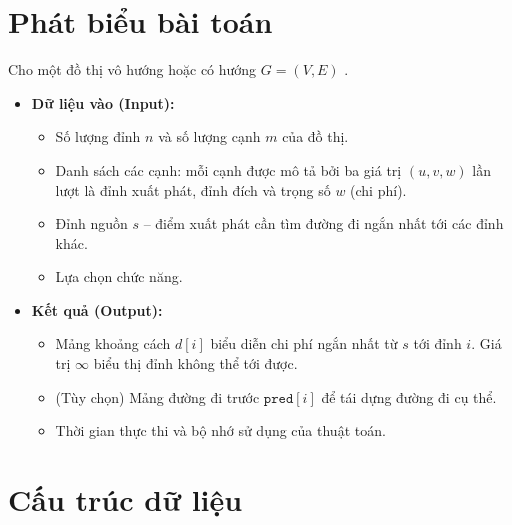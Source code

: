 \documentclass[14pt,a4paper]{report}
\begin{document}
\section{Phát biểu bài toán}
\justifying\fontsize{12pt}{13pt}\selectfont
Cho một đồ thị vô hướng hoặc có hướng $ G = (V, E) $ . 

\begin{itemize}
  \item \textbf{Dữ liệu vào (Input):}
  \begin{itemize}
    \item Số lượng đỉnh $n$ và số lượng cạnh $m$ của đồ thị.
    \item Danh sách các cạnh: mỗi cạnh được mô tả bởi ba giá trị $(u, v, w)$ lần lượt là đỉnh xuất phát, đỉnh đích và trọng số $w$ (chi phí).
    \item Đỉnh nguồn $s$ -- điểm xuất phát cần tìm đường đi ngắn nhất tới các đỉnh khác.
    \item Lựa chọn chức năng.
  \end{itemize}

  \item \textbf{Kết quả (Output):}
  \begin{itemize}
    \item Mảng khoảng cách $d[i]$ biểu diễn chi phí ngắn nhất từ $s$ tới đỉnh $i$. Giá trị $\infty$ biểu thị đỉnh không thể tới được.
    \item (Tùy chọn) Mảng đường đi trước $\texttt{pred}[i]$ để tái dựng đường đi cụ thể.
    \item Thời gian thực thi và bộ nhớ sử dụng của thuật toán.
  \end{itemize}
\end{itemize}





\section{Cấu trúc dữ liệu}
\end{document}
